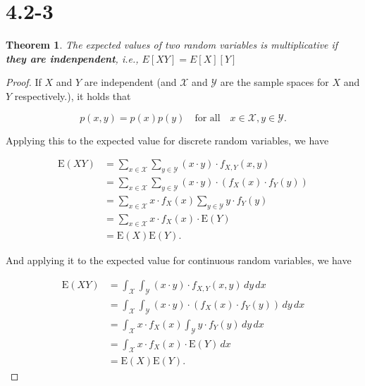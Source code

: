 \documentclass[12pt]{article}
\newtheorem{theorem}{Theorem}[section]
\theoremstyle{definition}
\theoremstyle{remark}
\begin{document}
\section*{4.2-3}
\noindent\makebox[\linewidth]{\rule{\linewidth}{0.4pt}}
\begin{theorem}
The expected values of two random variables is multiplicative if \textbf{they are indenpendent}, i.e., $E[XY]=E[X][Y]$
\end{theorem}
\begin{proof}
If $X$ and $Y$ are independent (and $\mathcal{X}$ and $\mathcal{Y}$ are the sample spaces for $X$ and $Y$ respectively.), it holds that

\begin{equation}
p(x, y) = p(x)p(y) \quad \text{for all} \quad x \in \mathcal{X}, y \in \mathcal{Y} .
\end{equation}

Applying this to the expected value for discrete random variables, we have

\begin{align*}
\text{E}(XY) &= \sum_{x \in \mathcal{X}} \sum_{y \in \mathcal{Y}} (x \cdot y) \cdot f_{X,Y}(x, y) \\ 
&= \sum_{x \in \mathcal{X}} \sum_{y \in \mathcal{Y}} (x \cdot y) \cdot (f_X(x) \cdot f_Y(y)) \\ 
&= \sum_{x \in \mathcal{X}} x \cdot f_X(x) \sum_{y \in \mathcal{Y}} y \cdot f_Y(y) \\ 
&= \sum_{x \in \mathcal{X}} x \cdot f_X(x) \cdot \text{E}(Y) \\ 
&= \text{E}(X)\text{E}(Y) . 
\end{align*}

And applying it to the expected value for continuous random variables, we have

\begin{align*} 
\text{E}(XY) &= \int_{\mathcal{X}} \int_{\mathcal{Y}} (x \cdot y) \cdot f_{X,Y}(x, y) \,dy \,dx \\ 
&= \int_{\mathcal{X}} \int_{\mathcal{Y}} (x \cdot y) \cdot (f_X(x) \cdot f_Y(y)) \,dy \,dx \\ 
&= \int_{\mathcal{X}} x \cdot f_X(x) \int_{\mathcal{Y}} y \cdot f_Y(y) \,dy \,dx \\ 
&= \int_{\mathcal{X}} x \cdot f_X(x) \cdot \text{E}(Y) \,dx \\ 
&= \text{E}(X)\text{E}(Y) . 
\end{align*}
\end{proof}
\end{document}

